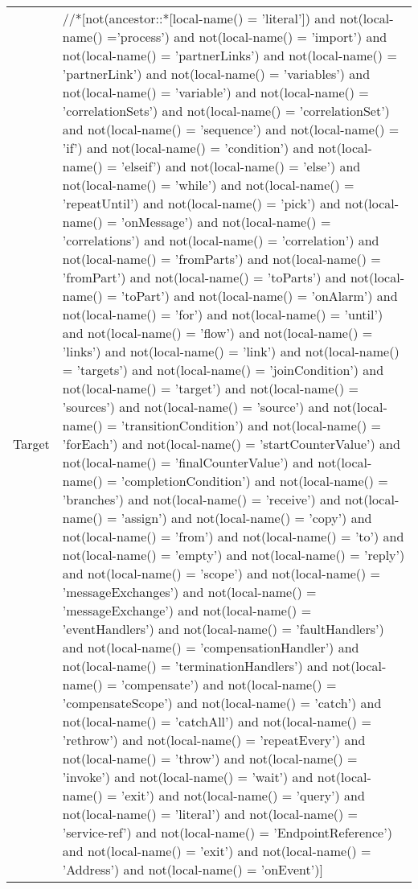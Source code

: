 \begin{center}
\begin{tiny}
\begin{longtable}{p{}|p{}}
Target & //*[not(ancestor::*[local-name() = 'literal']) and not(local-name() ='process') and not(local-name() = 'import') and not(local-name() = 'partnerLinks') and not(local-name() = 'partnerLink') and not(local-name() = 'variables') and not(local-name() = 'variable') and not(local-name() = 'correlationSets') and not(local-name() = 'correlationSet') and not(local-name() = 'sequence') and not(local-name() = 'if') and not(local-name() = 'condition') and not(local-name() = 'elseif') and not(local-name() = 'else') and not(local-name() = 'while') and not(local-name() = 'repeatUntil') and not(local-name() = 'pick') and not(local-name() = 'onMessage') and not(local-name() = 'correlations') and not(local-name() = 'correlation') and not(local-name() = 'fromParts') and not(local-name() = 'fromPart') and not(local-name() = 'toParts') and not(local-name() = 'toPart') and not(local-name() = 'onAlarm') and not(local-name() = 'for') and not(local-name() = 'until') and not(local-name() = 'flow') and not(local-name() = 'links') and not(local-name() = 'link') and not(local-name() = 'targets') and not(local-name() = 'joinCondition') and not(local-name() = 'target') and not(local-name() = 'sources') and not(local-name() = 'source') and not(local-name() = 'transitionCondition') and not(local-name() = 'forEach') and not(local-name() = 'startCounterValue') and not(local-name() = 'finalCounterValue') and not(local-name() = 'completionCondition') and not(local-name() = 'branches') and not(local-name() = 'receive') and not(local-name() = 'assign') and not(local-name() = 'copy') and not(local-name() = 'from') and not(local-name() = 'to') and not(local-name() = 'empty') and not(local-name() = 'reply') and not(local-name() = 'scope') and not(local-name() = 'messageExchanges') and not(local-name() = 'messageExchange') and not(local-name() = 'eventHandlers') and not(local-name() = 'faultHandlers') and not(local-name() = 'compensationHandler') and not(local-name() = 'terminationHandlers') and not(local-name() = 'compensate') and not(local-name() = 'compensateScope') and not(local-name() = 'catch') and not(local-name() = 'catchAll')  and not(local-name() = 'rethrow') and not(local-name() = 'repeatEvery') and not(local-name() = 'throw') and not(local-name() = 'invoke') and not(local-name() = 'wait') and not(local-name() = 'exit') and not(local-name() = 'query') and not(local-name() = 'literal') and not(local-name() = 'service-ref') and not(local-name() = 'EndpointReference') and not(local-name() = 'exit') and not(local-name() = 'Address') and not(local-name() = 'onEvent')]\\

\end{longtable}
\end{tiny}
\end{center}
